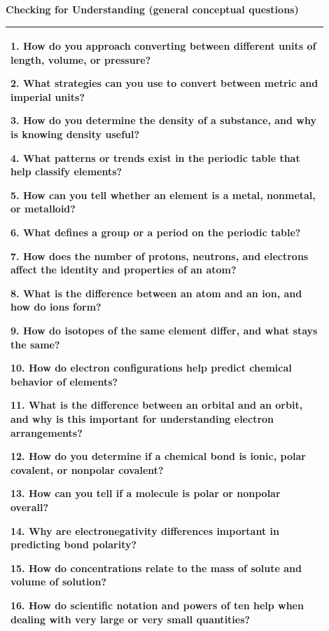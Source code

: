 \documentclass{article}
\begin{document}
\newpage
{\large\textbf{Checking for Understanding (general conceptual questions)}}\\
\begin{tabular}{|p{0.9\linewidth}|}
\hline

1. How do you approach converting between different units of length, volume, or pressure?

2. What strategies can you use to convert between metric and imperial units?

3. How do you determine the density of a substance, and why is knowing density useful?

4. What patterns or trends exist in the periodic table that help classify elements?

5. How can you tell whether an element is a metal, nonmetal, or metalloid?

6. What defines a group or a period on the periodic table?

7. How does the number of protons, neutrons, and electrons affect the identity and properties of an atom?

8. What is the difference between an atom and an ion, and how do ions form?

9. How do isotopes of the same element differ, and what stays the same?

10. How do electron configurations help predict chemical behavior of elements?

11. What is the difference between an orbital and an orbit, and why is this important for understanding electron arrangements?

12. How do you determine if a chemical bond is ionic, polar covalent, or nonpolar covalent?

13. How can you tell if a molecule is polar or nonpolar overall?

14. Why are electronegativity differences important in predicting bond polarity?

15. How do concentrations relate to the mass of solute and volume of solution?

16. How do scientific notation and powers of ten help when dealing with very large or very small quantities?
\\
\hline
\end{tabular}
\newpage

\noindent
\end{document}

